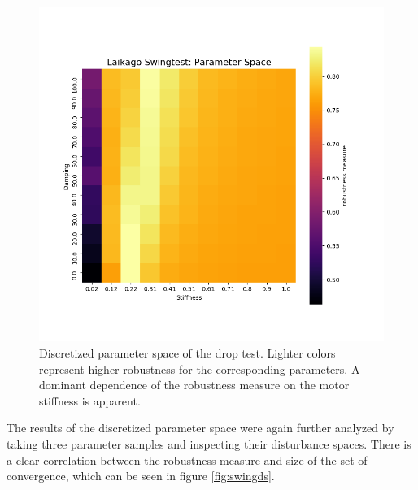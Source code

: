     \begin{figure}[h]
    \centering
    \includegraphics[width=.5\linewidth]{figures/swingtest_ps.png}
    \caption[Discretized Parameter Space, Swing Test]{Discretized parameter space of the drop test. Lighter colors represent higher robustness for the corresponding parameters. A dominant dependence of the robustness measure on the motor stiffness is apparent.}
    \label{fig:swingps}
    \end{figure}    

    
    \newpage
    The results of the discretized parameter space were again further analyzed by taking three parameter samples and inspecting their disturbance spaces. There is a clear correlation between the robustness measure and size of the set of convergence, which can be seen in figure \ref{fig:swingds}. 
    
